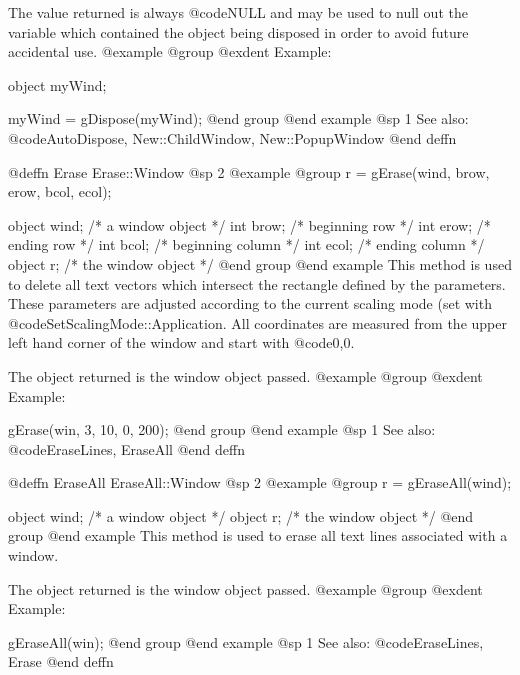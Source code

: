 The value returned is always @code{NULL} and may be used to null out
the variable which contained the object being disposed in order to
avoid future accidental use.
@example
@group
@exdent Example:

object  myWind;

myWind = gDispose(myWind);
@end group
@end example
@sp 1
See also:  @code{AutoDispose, New::ChildWindow, New::PopupWindow}
@end deffn










@deffn {Erase} Erase::Window
@sp 2
@example
@group
r = gErase(wind, brow, erow, bcol, ecol);

object  wind;   /*  a window object     */
int     brow;   /*  beginning row       */
int     erow;   /*  ending row          */
int     bcol;   /*  beginning column    */
int     ecol;   /*  ending column       */
object  r;      /*  the window object   */
@end group
@end example
This method is used to delete all text vectors which intersect the
rectangle defined by the parameters.  These parameters are adjusted
according to the current scaling mode (set with
@code{SetScalingMode::Application}.  All coordinates are measured from
the upper left hand corner of the window and start with @code{0,0}.

The object returned is the window object passed.
@example
@group
@exdent Example:

gErase(win, 3, 10, 0, 200);
@end group
@end example
@sp 1
See also:  @code{EraseLines, EraseAll}
@end deffn










@deffn {EraseAll} EraseAll::Window
@sp 2
@example
@group
r = gEraseAll(wind);

object  wind;   /*  a window object     */
object  r;      /*  the window object   */
@end group
@end example
This method is used to erase all text lines associated with a window.

The object returned is the window object passed.
@example
@group
@exdent Example:

gEraseAll(win);
@end group
@end example
@sp 1
See also:  @code{EraseLines, Erase}
@end deffn











